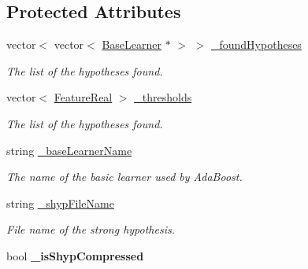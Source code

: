 \subsection*{Protected Attributes}
\begin{DoxyCompactItemize}
\item 
\hypertarget{classMultiBoost_1_1VJCascadeLearner_a94a603c3841ff56492cbd00fa0bce504}{vector$<$ vector$<$ \hyperlink{classMultiBoost_1_1BaseLearner}{Base\-Learner} $\ast$ $>$ $>$ \hyperlink{classMultiBoost_1_1VJCascadeLearner_a94a603c3841ff56492cbd00fa0bce504}{\-\_\-found\-Hypotheses}}\label{classMultiBoost_1_1VJCascadeLearner_a94a603c3841ff56492cbd00fa0bce504}

\begin{DoxyCompactList}\small\item\em The list of the hypotheses found. \end{DoxyCompactList}\item 
\hypertarget{classMultiBoost_1_1VJCascadeLearner_aeea649168623b37daf94785a1c05ff4d}{vector$<$ \hyperlink{Defaults_8h_a3a11cfe6a5d469d921716ca6291e934f}{Feature\-Real} $>$ \hyperlink{classMultiBoost_1_1VJCascadeLearner_aeea649168623b37daf94785a1c05ff4d}{\-\_\-thresholds}}\label{classMultiBoost_1_1VJCascadeLearner_aeea649168623b37daf94785a1c05ff4d}

\begin{DoxyCompactList}\small\item\em The list of the hypotheses found. \end{DoxyCompactList}\item 
\hypertarget{classMultiBoost_1_1VJCascadeLearner_ab8db3392bac21c725cd0248ea4816139}{string \hyperlink{classMultiBoost_1_1VJCascadeLearner_ab8db3392bac21c725cd0248ea4816139}{\-\_\-base\-Learner\-Name}}\label{classMultiBoost_1_1VJCascadeLearner_ab8db3392bac21c725cd0248ea4816139}

\begin{DoxyCompactList}\small\item\em The name of the basic learner used by Ada\-Boost. \end{DoxyCompactList}\item 
\hypertarget{classMultiBoost_1_1VJCascadeLearner_aebe473f97066b9cd6584bca87d0af37e}{string \hyperlink{classMultiBoost_1_1VJCascadeLearner_aebe473f97066b9cd6584bca87d0af37e}{\-\_\-shyp\-File\-Name}}\label{classMultiBoost_1_1VJCascadeLearner_aebe473f97066b9cd6584bca87d0af37e}

\begin{DoxyCompactList}\small\item\em File name of the strong hypothesis. \end{DoxyCompactList}\item 
\hypertarget{classMultiBoost_1_1VJCascadeLearner_adfb22fcd8c8f13eb2da30d7023a38a7c}{bool {\bfseries \-\_\-is\-Shyp\-Compressed}}\label{classMultiBoost_1_1VJCascadeLearner_adfb22fcd8c8f13eb2da30d7023a38a7c}


\end{DoxyCompactItemize}
